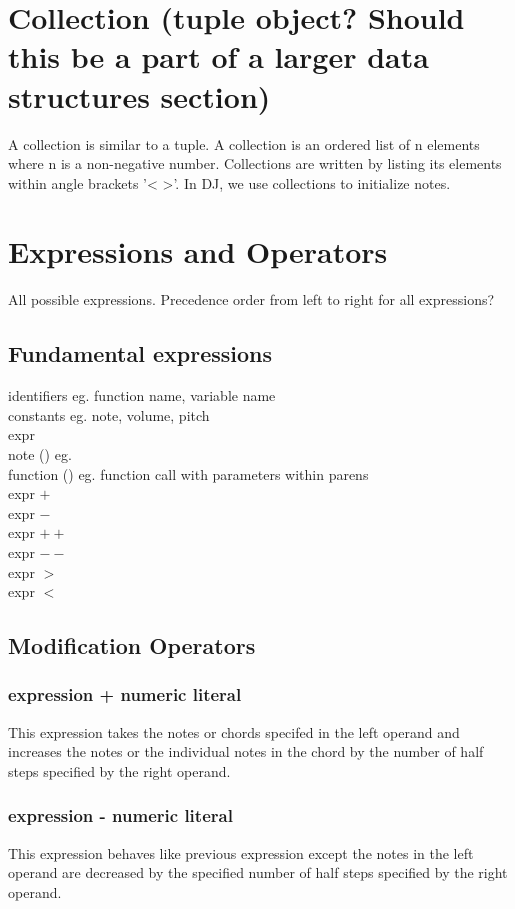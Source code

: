 \documentclass[letterpaper]{article}
\begin{document}
\section{Collection (tuple object? Should this be a part of a larger data structures section)}
A collection is similar to a tuple. A collection is an ordered list of n elements where n is a non-negative number. Collections are written by listing its elements within angle brackets '< >'. In DJ, we use collections to initialize notes. 
\section{Expressions and Operators}
All possible expressions. Precedence order from left to right for all expressions?
\subsection{Fundamental expressions}
identifiers eg. function name, variable name\\
constants eg. note, volume, pitch\\
expr\\
note () eg.\\
function () eg. function call with parameters within parens\\
expr $+$\\
expr $-$\\
expr $++$\\
expr $--$\\
expr $>$\\
expr $<$\\

\subsection{Modification Operators}
\subsubsection{expression + numeric literal}
This expression takes the notes or chords specifed in the left operand and increases the notes or the individual notes in the chord by the number of half steps specified by the right operand. 

\subsubsection{expression - numeric literal}
This expression behaves like previous expression except the notes in the left operand are decreased by the specified number of half steps specified by the right operand. 
\end{document}
